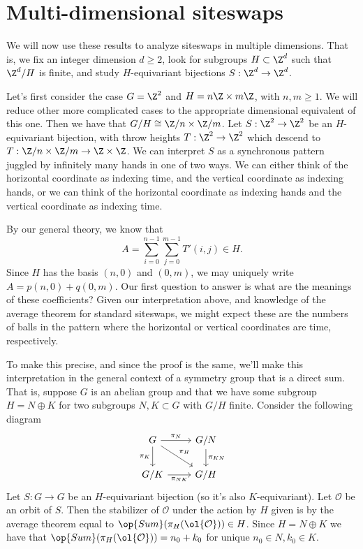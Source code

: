 \documentclass[12nt]{article}
\theoremstyle{plain}
\begin{document}
\section{Multi-dimensional siteswaps}

We will now use these results to analyze siteswaps in multiple dimensions. That is, we fix an integer dimension $d \geq 2$, look for subgroups $H \subset \Z^d$ such that $\Z^d/H$ is finite, and study $H$-equivariant bijections $S : \Z^d \to \Z^d$. 

Let's first consider the case $G = \Z^2$ and $H = n\Z \times m\Z$, with $n, m \geq 1$. We will reduce other more complicated cases to the appropriate dimensional equivalent of this one. Then we have that $G/H \cong \Z/n \times \Z/m$. Let $S : \Z^2 \to \Z^2$ be an $H$-equivariant bijection, with throw heights $T : \Z^2 \to \Z^2$ which descend to $T : \Z/n \times \Z/m \to \Z \times \Z$. We can interpret $S$ as a synchronous pattern juggled by infinitely many hands in one of two ways. We can either think of the horizontal coordinate as indexing time, and the vertical coordinate as indexing hands, or we can think of the horizontal coordinate as indexing hands and the vertical coordinate as indexing time.

By our general theory, we know that 
\[
A = \sum \limits_{i = 0}^{n-1} \sum \limits_{j=0}^{m-1} T'(i, j) \in H.
\]
Since $H$ has the basis $(n, 0)$ and  $(0, m)$, we may uniquely write $A = p(n, 0) + q(0, m)$. Our first question to answer is what are the meanings of these coefficients? Given our interpretation above, and knowledge of the average theorem for standard siteswaps, we might expect these are the numbers of balls in the pattern where the horizontal or vertical coordinates are time, respectively. 

To make this precise, and since the proof is the same, we'll make this interpretation in the general context of a symmetry group that is a direct sum. That is, suppose $G$ is an abelian group and that we have some subgroup $H = N \oplus K$ for two subgroups $N, K \subset G$ with $G/H$ finite. Consider the following diagram
\[
\begin{tikzcd}
G\ar[d, "\pi_K"'] \ar[dr, "\pi_H"] \ar[r, "\pi_N"] & G/N \ar[d, "\pi_{KN}"] \\
G/K \ar[r, "\pi_{NK}"'] & G/H
\end{tikzcd}
\]
Let $S : G \to G$ be an $H$-equivariant bijection (so it's also $K$-equivariant). Let $\mathcal{O}$ be an orbit of $S$. Then the stabilizer of $\mathcal{O}$ under the action by $H$ given is by the average theorem equal to $\op{Sum}(\pi_H(\ol{\mathcal{O}})) \in H$. Since $H = N \oplus K$ we have that $\op{Sum}(\pi_H(\ol{\mathcal{O}})) = n_0 + k_0$ for unique $n_0 \in N, k_0 \in K$. 
\end{document}
